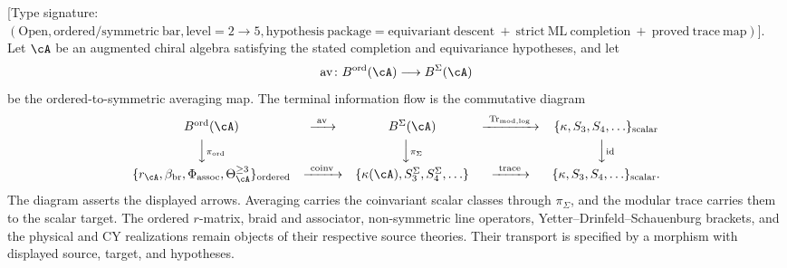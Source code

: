 \begin{proposition}
\label{prop:master-ordered-symmetric-survival-diagram}
\textup{[}Type signature:
$(\mathrm{Open},\mathrm{ordered/symmetric\ bar},
\mathrm{level}=2\to5,
\mathrm{hypothesis\ package}=\mathrm{equivariant\ descent}
\ +\ \mathrm{strict\ ML\ completion}
\ +\ \mathrm{proved\ trace\ map})$\textup{].}
Let \(\cA\) be an augmented chiral algebra satisfying the stated
completion and equivariance hypotheses, and let
\[
\mathrm{av}\colon B^{\mathrm{ord}}(\cA)\longrightarrow B^\Sigma(\cA)
\]
be the ordered-to-symmetric averaging map.  The terminal information
flow is the commutative diagram
\[
\begin{array}{ccccc}
B^{\mathrm{ord}}(\cA)
& \xrightarrow{\ \mathrm{av}\ }
& B^\Sigma(\cA)
& \xrightarrow{\ \Tr_{\mathrm{mod},\log}\ }
& \{\kappa,S_3,S_4,\ldots\}_{\mathrm{scalar}} \\[4pt]
\Big\downarrow{\scriptstyle \pi_{\mathrm{ord}}}
&&
\Big\downarrow{\scriptstyle \pi_{\Sigma}}
&&
\Big\downarrow{\scriptstyle \mathrm{id}} \\[4pt]
\{r_\cA,\beta_{\mathrm{br}},\Phi_{\mathrm{assoc}},
\Theta_\cA^{\ge3}\}_{\mathrm{ordered}}
& \xrightarrow{\ \mathrm{coinv}\ }
& \{\kappa(\cA),S_3^\Sigma,S_4^\Sigma,\ldots\}
& \xrightarrow{\ \mathrm{trace}\ }
& \{\kappa,S_3,S_4,\ldots\}_{\mathrm{scalar}} .
\end{array}
\]
The diagram asserts the displayed arrows.  Averaging carries the
coinvariant scalar classes through \(\pi_\Sigma\), and the modular trace
carries them to the scalar target.  The ordered \(r\)-matrix, braid and
associator, non-symmetric line operators, Yetter--Drinfeld--Schauenburg
brackets, and the physical and CY realizations remain objects of their
respective source theories.  Their transport is specified by a morphism
with displayed source, target, and hypotheses.
\end{proposition}

